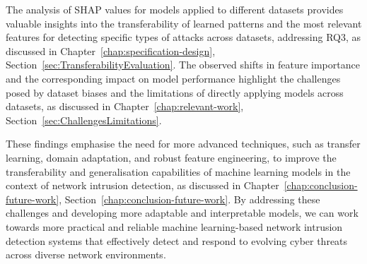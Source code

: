 The analysis of SHAP values for models applied to different datasets provides valuable insights into the transferability of learned patterns and the most relevant features for detecting specific types of attacks across datasets, addressing RQ3, as discussed in Chapter~\ref{chap:specification-design}, Section~\ref{sec:TransferabilityEvaluation}. The observed shifts in feature importance and the corresponding impact on model performance highlight the challenges posed by dataset biases and the limitations of directly applying models across datasets, as discussed in Chapter~\ref{chap:relevant-work}, Section~\ref{sec:ChallengesLimitations}.

These findings emphasise the need for more advanced techniques, such as transfer learning, domain adaptation, and robust feature engineering, to improve the transferability and generalisation capabilities of machine learning models in the context of network intrusion detection, as discussed in Chapter~\ref{chap:conclusion-future-work}, Section~\ref{chap:conclusion-future-work}. By addressing these challenges and developing more adaptable and interpretable models, we can work towards more practical and reliable machine learning-based network intrusion detection systems that effectively detect and respond to evolving cyber threats across diverse network environments.